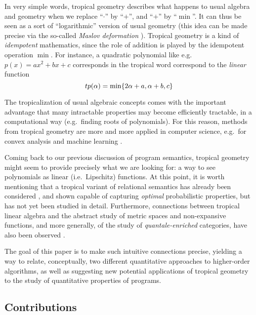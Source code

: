 In very simple words, tropical geometry describes what happens to usual algebra and geometry when we replace ``$\cdot$'' by  ``$+$'', and ``$+$'' by ``$\min$''. It can thus be seen as a sort of ``logarithmic'' version of usual geometry (this idea can be made precise via the so-called \emph{Maslov deformation} \cite{}).
Tropical geometry is a kind of \emph{idempotent} mathematics, since the role of addition is 
played by the idempotent operation $\min$.
For instance, a quadratic polynomial like e.g.~$p(x)=ax^{2}+bx+c$ corresponds in the tropical word correspond to the \emph{linear} function
$$
\trop p(\alpha)=\min\{2\alpha + a, \alpha+b, c\}
$$ 

The tropicalization of usual algebraic concepts comes with the important advantage that many intractable properties may become efficiently tractable, in a computational way (e.g.~finding roots of polynomials). For this reason, methods from tropical geometry are more and more applied in computer science, e.g.~for convex analysis and machine learning \cite{}.

Coming back to our previous discussion of program semantics, tropical geometry might seem to provide precisely what we are looking for: a way to see polynomials as linear (i.e.~Lipschitz) functions.
At this point, it is worth mentioning that a tropical variant of relational semantics has already been considered \cite{}, and shown capable of capturing \emph{optimal} probabilistic properties, but has not yet been studied in detail. Furthermore, connections between tropical linear algebra and the abstract study of metric spaces and non-expansive functions, and more generally, of the study of \emph{quantale-enriched} categories, have also been observed \cite{}.

The goal of this paper is to make such intuitive connections precise, yielding a way to relate, conceptually, two different quantitative approaches to higher-order algorithms, as well as suggesting new potential applications of tropical geometry to the study of quantitative properties of programs.


\subsection{Contributions}

